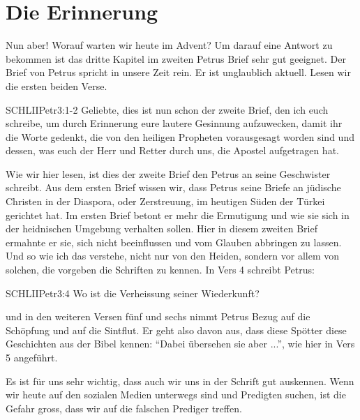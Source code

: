 \documentclass[fontsize=16pt]{mybib}
\begin{document}
\section{Die Erinnerung}
Nun aber! Worauf warten wir heute im Advent? Um darauf eine Antwort zu bekommen ist das dritte Kapitel im zweiten Petrus Brief sehr gut geeignet. Der Brief von Petrus spricht in unsere Zeit rein. Er ist unglaublich aktuell. Lesen wir die ersten beiden Verse.
\begin{bibelbox}{SCHL}{IIPetr}{3:1-2}
  Geliebte, dies ist nun schon der zweite Brief, den ich euch schreibe, um durch Erinnerung eure lautere Gesinnung aufzuwecken, damit ihr die Worte gedenkt, die von den heiligen Propheten vorausgesagt worden sind und dessen, was euch der Herr und Retter durch uns, die Apostel aufgetragen hat.
\end{bibelbox}
Wie wir hier lesen, ist dies der zweite Brief den Petrus an seine Geschwister schreibt. Aus dem ersten Brief wissen wir, dass Petrus seine Briefe an jüdische Christen in der Diaspora, oder Zerstreuung, im heutigen Süden der Türkei gerichtet hat. Im ersten Brief betont er mehr die Ermutigung und wie sie sich in der heidnischen Umgebung verhalten sollen. Hier in diesem zweiten Brief ermahnte er sie, sich nicht beeinflussen und vom Glauben abbringen zu lassen.\\
Und so wie ich das verstehe, nicht nur von den Heiden, sondern vor allem von solchen, die vorgeben die Schriften zu kennen. In Vers 4 schreibt Petrus:
\begin{bibelbox}{SCHL}{IIPetr}{3:4}
  Wo ist die Verheissung seiner Wiederkunft?
\end{bibelbox}
und in den weiteren Versen fünf und sechs nimmt Petrus Bezug auf die Schöpfung und auf die Sintflut. Er geht also davon aus, dass diese Spötter diese Geschichten aus der Bibel kennen: \enquote{Dabei übersehen sie aber  ...}, wie hier in Vers 5 angeführt.

Es ist für uns sehr wichtig, dass auch wir uns in der Schrift gut auskennen. Wenn wir heute auf den sozialen Medien unterwegs sind und Predigten suchen, ist die Gefahr gross, dass wir auf die falschen Prediger treffen.
\end{document}

